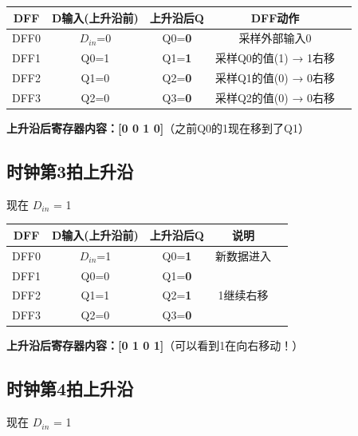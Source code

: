 \begin{beatanalysis}
\begin{center}
\begin{tabular}{|c|c|c|c|c|}
\hline
\textbf{DFF} & \textbf{D输入(上升沿前)} & \textbf{上升沿后Q} & \textbf{DFF动作} \\
\hline
DFF0 & $D_{in}$=0 & Q0=\textbf{0} & 采样外部输入0 \\
DFF1 & Q0=1 & Q1=\textbf{1} & 采样Q0的值(1) → 1右移 \\
DFF2 & Q1=0 & Q2=\textbf{0} & 采样Q1的值(0) → 0右移 \\
DFF3 & Q2=0 & Q3=\textbf{0} & 采样Q2的值(0) → 0右移 \\
\hline
\end{tabular}

\textbf{上升沿后寄存器内容：[0 0 1 0]}（之前Q0的1现在移到了Q1）
\end{center}
\end{beatanalysis}

\subsection{时钟第3拍上升沿}

现在 $D_{in}$ = 1

\begin{beatanalysis}
\begin{center}
\begin{tabular}{|c|c|c|c|c|}
\hline
\textbf{DFF} & \textbf{D输入(上升沿前)} & \textbf{上升沿后Q} & \textbf{说明} \\
\hline
DFF0 & $D_{in}$=1 & Q0=\textbf{1} & 新数据进入 \\
DFF1 & Q0=0 & Q1=\textbf{0} & \\
DFF2 & Q1=1 & Q2=\textbf{1} & 1继续右移 \\
DFF3 & Q2=0 & Q3=\textbf{0} & \\
\hline
\end{tabular}

\textbf{上升沿后寄存器内容：[0 1 0 1]}（可以看到1在向右移动！）
\end{center}
\end{beatanalysis}

\subsection{时钟第4拍上升沿}

现在 $D_{in}$ = 1


